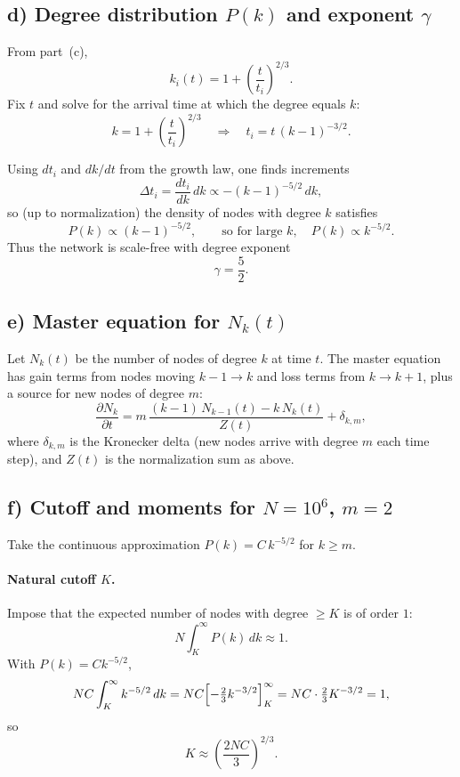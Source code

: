 \documentclass[11pt,a4paper]{article}
\begin{document}
\subsection*{d) Degree distribution $P(k)$ and exponent $\gamma$}

From part~(c),
\[
  k_i(t) = 1 + \left(\frac{t}{t_i}\right)^{2/3}.
\]
Fix $t$ and solve for the arrival time at which the degree equals $k$:
\[
  k = 1 + \left(\frac{t}{t_i}\right)^{2/3}
  \quad\Rightarrow\quad
  t_i = t\,(k-1)^{-3/2}.
\]

Using $dt_i$ and $dk/dt$ from the growth law, one finds increments
\[
  \Delta t_i = \frac{dt_i}{dk}\,dk \propto -(k-1)^{-5/2}\,dk,
\]
so (up to normalization) the density of nodes with degree $k$ satisfies
\[
  P(k) \propto (k-1)^{-5/2},
  \qquad\text{so for large }k,\quad
  P(k) \propto k^{-5/2}.
\]
Thus the network is scale-free with degree exponent
\[
  \gamma = \frac{5}{2}.
\]

\subsection*{e) Master equation for $N_k(t)$}

Let $N_k(t)$ be the number of nodes of degree $k$ at time $t$. The master equation has gain terms from nodes moving $k-1\to k$ and loss terms from $k\to k+1$, plus a source for new nodes of degree $m$:
\[
  \frac{\partial N_k}{\partial t}
  = m\,\frac{(k-1)\,N_{k-1}(t) - k\,N_k(t)}{Z(t)} + \delta_{k,m},
\]
where $\delta_{k,m}$ is the Kronecker delta (new nodes arrive with degree $m$ each time step), and $Z(t)$ is the normalization sum as above.

\subsection*{f) Cutoff and moments for $N=10^6$, $m=2$}

Take the continuous approximation $P(k) = C\,k^{-5/2}$ for $k\ge m$.

\paragraph{Natural cutoff $K$.}
Impose that the expected number of nodes with degree $\ge K$ is of order $1$:
\[
  N \int_K^{\infty} P(k)\,dk \approx 1.
\]
With $P(k)=Ck^{-5/2}$,
\[
  N C \int_K^{\infty} k^{-5/2}\,dk
  = N C \Bigl[-\tfrac{2}{3} k^{-3/2}\Bigr]_K^{\infty}
  = N C \cdot \tfrac{2}{3} K^{-3/2} = 1,
\]
so
\[
  K \approx \left(\frac{2N C}{3}\right)^{2/3}.
\]
\end{document}
